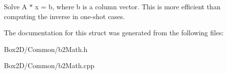 Solve A $\ast$ x = b, where b is a column vector. This is more efficient than computing the inverse in one-\/shot cases. 

The documentation for this struct was generated from the following files\+:\begin{DoxyCompactItemize}
\item 
Box2\+D/\+Common/b2\+Math.\+h\item 
Box2\+D/\+Common/b2\+Math.\+cpp\end{DoxyCompactItemize}
